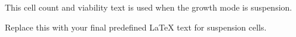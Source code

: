 This cell count and viability text is used when the growth mode is suspension.

Replace this with your final predefined LaTeX text for suspension cells.

